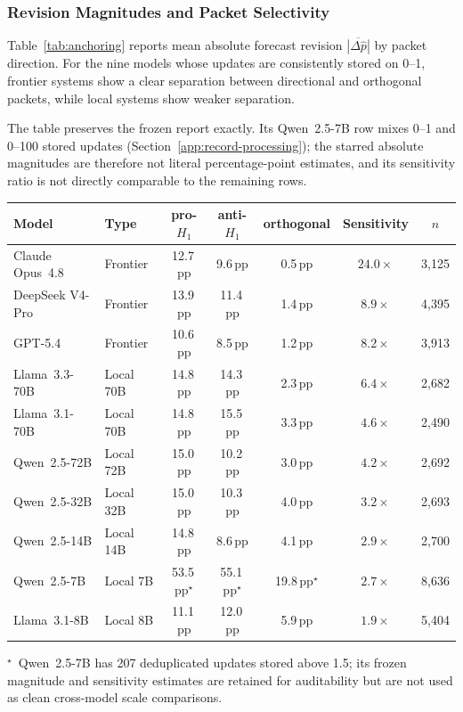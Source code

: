 \subsubsection{Revision Magnitudes and Packet Selectivity}
Table~\ref{tab:anchoring} reports mean absolute forecast revision
\(\overline{|\Delta\hat p|}\) by packet direction.  For the nine models whose updates
are consistently stored on 0--1, frontier systems show a clear separation between
directional and orthogonal packets, while local systems show weaker separation.

The table preserves the frozen report exactly.  Its Qwen~2.5-7B row mixes 0--1 and
0--100 stored updates (Section~\ref{app:record-processing}); the starred absolute
magnitudes are therefore not literal percentage-point estimates, and its sensitivity
ratio is not directly comparable to the remaining rows.

\begin{center}
\begin{minipage}{\linewidth}
\centering
{}
\label{tab:anchoring}
\small
\begin{tabular}{llccccc}
\toprule
\textbf{Model} & \textbf{Type} & pro-$H_1$ & anti-$H_1$ & orthogonal
  & \textbf{Sensitivity} & $n$ \\
\midrule
Claude Opus~4.8 & Frontier  & 12.7\,pp & 9.6\,pp  & 0.5\,pp & $24.0\times$ & 3{,}125 \\
DeepSeek V4-Pro & Frontier  & 13.9\,pp & 11.4\,pp & 1.4\,pp & $8.9\times$  & 4{,}395 \\
GPT-5.4         & Frontier  & 10.6\,pp & 8.5\,pp  & 1.2\,pp & $8.2\times$  & 3{,}913 \\
\midrule
Llama~3.3-70B   & Local 70B & 14.8\,pp & 14.3\,pp & 2.3\,pp & $6.4\times$  & 2{,}682 \\
Llama~3.1-70B   & Local 70B & 14.8\,pp & 15.5\,pp & 3.3\,pp & $4.6\times$  & 2{,}490 \\
Qwen~2.5-72B    & Local 72B & 15.0\,pp & 10.2\,pp & 3.0\,pp & $4.2\times$  & 2{,}692 \\
Qwen~2.5-32B    & Local 32B & 15.0\,pp & 10.3\,pp & 4.0\,pp & $3.2\times$  & 2{,}693 \\
Qwen~2.5-14B    & Local 14B & 14.8\,pp &  8.6\,pp & 4.1\,pp & $2.9\times$  & 2{,}700 \\
Qwen~2.5-7B     & Local 7B  & 53.5\,pp$^\star$ & 55.1\,pp$^\star$ & 19.8\,pp$^\star$ & $2.7\times$ & 8{,}636 \\
Llama~3.1-8B    & Local 8B  & 11.1\,pp & 12.0\,pp & 5.9\,pp & $1.9\times$  & 5{,}404 \\
\bottomrule
\end{tabular}
\end{minipage}
\end{center}
$^\star$~Qwen~2.5-7B has 207 deduplicated updates stored above 1.5; its frozen
magnitude and sensitivity estimates are retained for auditability but are not used as
clean cross-model scale comparisons.


